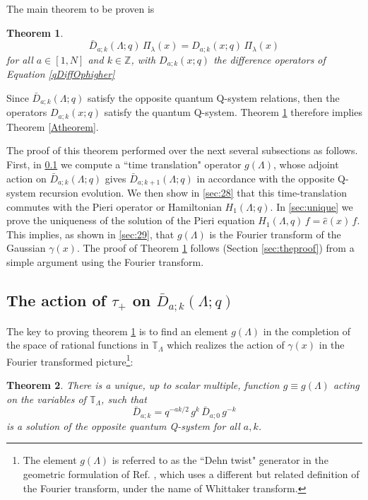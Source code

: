 \documentclass[12pt]{amsart}
\newtheorem{thm}{Theorem}[section]
\newcommand{\Z}{{\mathbb Z}}
\newcommand{\lL}{{\Lambda}}
\numberwithin{equation}{section}
\begin{document}
The main theorem to be proven is
\begin{thm}\label{mainthm}
$$ \bar D_{a;k}(\Lambda;q)\, \Pi_\lambda(x) = D_{a;k}(x;q)\, \Pi_\lambda(x)$$
for all $a\in[1,N]$ and $k\in\Z$, with $D_{a;k}(x;q)$ the difference operators of Equation \eqref{qDiffOphigher}
\end{thm}
Since $\bar D_{a;k}(\Lambda;q)$ satisfy the opposite quantum Q-system relations, then the operators $D_{a;k}(x;q)$ satisfy the quantum Q-system. Theorem \ref{mainthm} therefore implies Theorem \ref{Atheorem}.

The proof of this theorem performed over the next several subsections as follows. First, in \ref{sec:27} we compute a ``time translation" operator $g(\Lambda)$, whose adjoint action on $\bar D_{a;k}(\Lambda;q)$ gives $\bar D_{a;k+1}(\Lambda;q)$ in accordance with the opposite Q-system recursion evolution. We then show in \ref{sec:28} that this time-translation commutes with the Pieri operator or Hamiltonian $H_1(\Lambda;q)$. In \ref{sec:unique} we prove the uniqueness of the solution of the Pieri equation $H_1(\Lambda,q)\,f=\hat e(x)\, f$. This implies, as shown in \ref{sec:29}, that $g(\Lambda)$ is the Fourier transform of the Gaussian $\gamma(x)$. The proof of Theorem \ref{mainthm}  follows (Section \ref{sec:theproof}) from a simple argument using the Fourier transform.

\subsection{The action of $\tau_+$ on $\bar D_{a;k}(\Lambda;q)$}\label{sec:27}
The key to proving theorem \ref{mainthm} is to find an element $g(\Lambda)$ in the completion of the space of rational functions in $\mathbb T_\Lambda$ which realizes the action of $\gamma(x)$ in the Fourier transformed picture\footnote{The element $g(\lL)$ is referred to as the ``Dehn twist" generator in the geometric formulation of Ref. \cite{SS}, which uses a different but related definition of the Fourier transform, under the name of Whittaker transform.}:
\begin{thm}\label{gfunctionA}
There is a unique, up to scalar multiple, function $g\equiv g(\Lambda)$ acting on the variables of $\mathbb T_\Lambda$, such that
\begin{equation}\label{gevolution}
\bar D_{a;k} = q^{-a k/2} \,g^k \,\bar D_{a;0} \,g^{-k}
\end{equation}
is a solution of the opposite quantum Q-system for all $a,k$.
\end{thm} 
\end{document}
